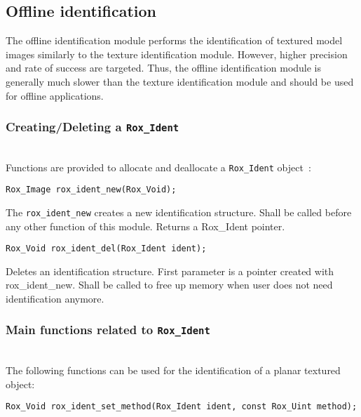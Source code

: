 \subsection{Offline identification}
\label{sse:ident_offline}

\noindent The offline identification module performs the identification of textured model images similarly to the texture identification module. However, higher precision and rate of success are targeted. Thus, the offline identification module is generally much slower than the texture identification module and should be used for offline applications.

\subsubsection{Creating/Deleting a {\tt Rox\_Ident}}
\label{sss:ident_newdel}
~\\

\noindent Functions are provided to allocate and deallocate a \lstinline$Rox_Ident$ object~:

\begin{lstlisting}
Rox_Image rox_ident_new(Rox_Void);
\end{lstlisting}

\noindent The \lstinline$rox_ident_new$ creates a new identification structure. Shall be called before
any other function of this module. Returns a Rox\_Ident pointer. \\

\begin{lstlisting}
Rox_Void rox_ident_del(Rox_Ident ident);
\end{lstlisting}

\noindent Deletes an identification structure. First parameter is a pointer
created with rox\_ident\_new. Shall be called to free up memory when
user does not need identification anymore.

\subsubsection{Main functions related to {\tt Rox\_Ident}}
\label{sss:ident_functions}
~\\

\noindent The following functions can be used for the identification of a planar textured object:

\begin{lstlisting}
Rox_Void rox_ident_set_method(Rox_Ident ident, const Rox_Uint method);
\end{lstlisting}


